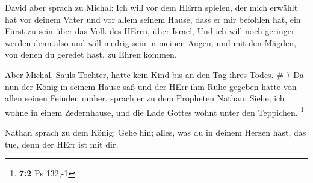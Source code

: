  David aber sprach zu Michal: Ich will vor dem HErrn
spielen, der mich erwählt hat vor deinem Vater und vor allem seinem
Hause, dass er mir befohlen hat, ein Fürst zu sein über das Volk des
HErrn, über Israel,  Und ich will noch geringer werden denn
also und will niedrig sein in meinen Augen, und mit den Mägden, von
denen du geredet hast, zu Ehren kommen.

 Aber Michal, Sauls Tochter, hatte kein Kind bis an den Tag
ihres Todes. \# 7  Da nun der König in seinem Hause saß und
der HErr ihm Ruhe gegeben hatte von allen seinen Feinden umher,
 sprach er zu dem Propheten Nathan: Siehe, ich wohne in
einem Zedernhause, und die Lade Gottes wohnt unter den Teppichen.
\footnote{\textbf{7:2} Ps 132,-1}

 Nathan sprach zu dem König: Gehe hin; alles, was du in
deinem Herzen hast, das tue, denn der HErr ist mit dir.

